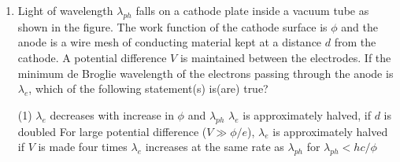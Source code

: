 
\begin{enumerate}
    \item Light of wavelength $\lambda_{ph}$ falls on a cathode plate inside a vacuum tube as shown in the figure. The work function of the cathode surface is $\phi$ and the anode is a wire mesh of conducting material kept at a distance $d$ from the cathode. A potential difference $V$ is maintained between the electrodes. If the minimum de Broglie wavelength of the electrons passing through the anode is $\lambda_e$, which of the following statement(s) is(are) true?
        \begin{tasks}(1)
            \task $\lambda_e$ decreases with increase in $\phi$ and $\lambda_{ph}$
            \task $\lambda_e$ is approximately halved, if $d$ is doubled
            \task For large potential difference ($V \gg \phi/e$), $\lambda_e$ is approximately halved if $V$ is made four times
            \task $\lambda_e$ increases at the same rate as $\lambda_{ph}$ for $\lambda_{ph} < hc/\phi$
        \end{tasks}
\end{enumerate}
\begin{center}
\end{center}
